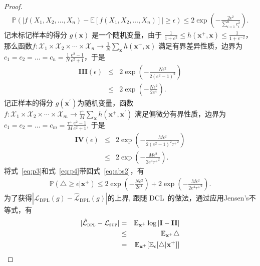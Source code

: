 \begin{lemma}
\begin{proof}
		\begin{eqnarray}
			\mathbb{P}(|f(X_{1},X_{2},\ldots ,X_{n})-\mathbb {E} [f(X_{1},X_{2},\ldots ,X_{n})]|\geq \epsilon )   \leq 2\exp \left(-{\frac {2\epsilon ^{2}}{\sum _{i=1}^{n}c_{i}^{2}}}\right). \nonumber
		\end{eqnarray}
记未标记样本的得分 $g(\mathbf{x})$ 是一个随机变量，由于 $ \frac{1}{1+e^{2}} \leq h(\mathbf{x}^+,\mathbf{x}) \leq \frac{1}{1+e^{-2}} $，那么函数$f:{\mathcal {X}}_{1}\times {\mathcal {X}}_{2}\times \cdots \times {\mathcal {X}}_{n}\rightarrow \frac{1}{N}  \sum_{\mathbf{x}}  h(\mathbf{x}^+,\mathbf{x})$ 满足有界差异性质，边界为 ${\displaystyle c_{1}=c_{2}=\dots =c_{n}} = \frac{1}{N}\frac{e^2-1}{e^2+1}$，于是
		\begin{eqnarray}
			\mathbf{III}(\epsilon)  
			&\leq& 2\exp \left(-\frac{N\epsilon^2}{2(e^2-1)^2} \right)  \\
			&\leq& 2\exp \left(-\frac{N\epsilon^2}{2e^4} \right).\label{eq:p3}
		\end{eqnarray}
		记正样本的得分 $g(\mathbf{x}^\prime)$为随机变量，函数$f:{\mathcal {X}}_{1}\times {\mathcal {X}}_{2}\times \cdots \times {\mathcal {X}}_{m}\rightarrow \frac{\tau^+}{M} \sum_{\mathbf{x}}  h(\mathbf{x}^+,\mathbf{x}^\prime) $ 满足偏微分有界性质，边界为 ${\displaystyle c_{1}=c_{2}=\dots =c_{m}} = \frac{\tau^+}{M}\frac{e^2-1}{e^2+1}$, 于是
		\begin{eqnarray}
			\mathbf{IV}(\epsilon)  
			&\leq& 2\exp \left(-\frac{M\epsilon^2}{2(e^2-1)^2{\tau^+}^2} \right)  \\
			&\leq& 2\exp \left(-\frac{M\epsilon^2}{2e^4{\tau^+}^2}  \right).\label{eq:p4}
		\end{eqnarray}
将式~\eqref{eq:p3}和式~\eqref{eq:p4}带回式~\eqref{eq:abs2}，有
		\begin{eqnarray}
			\mathbb{P}(\triangle \geq \epsilon|\mathbf{x}^+) \leq 2\exp \left(-\frac{N\epsilon^2}{2e^4} \right)+2\exp \left(-\frac{M\epsilon^2}{2e^4{\tau^+}^2}  \right). \label{eq:tail}
		\end{eqnarray}
为了获得$|\mathcal{L}_{\text{DPL}}(g) - \hat{\mathcal{L}}_\text{DPL}(g)| $的上界, 跟随 DCL~\cite{Chuang:2020:NIPS}的做法，通过应用Jensen's不等式，有
		\begin{eqnarray}
			|\hat{\mathcal{L}}_\textsc{dpl}-\mathcal{L}_\textsc{sup}|
			&=& \mathbb{E}_{\mathbf{x}^+} \log | \mathbf{I} - \mathbf{II}| \\
			&\leq& \mathbb{E}_{\mathbf{x}^+} \triangle\\
			&=&  \mathbb{E}_{\mathbf{x}^+} [\mathbb{E}_\epsilon[\triangle|\mathbf{x}^+]] \\

\end{eqnarray}
\end{proof}
\end{lemma}
